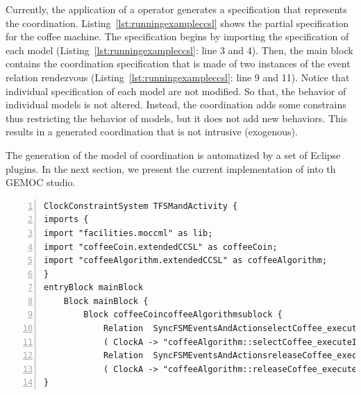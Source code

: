 Currently, the application of a \bcool operator generates a \ccsl specification that represents the coordination. Listing~\ref{lst:runningexampleccsl} shows the partial \ccsl specification for the coffee machine. The specification begins by importing the \ccsl specification of each model (Listing~\ref{lst:runningexampleccsl}: line 3 and 4). Then, the main block contains the coordination specification that is made of two instances of the event relation rendezvous (Listing~\ref{lst:runningexampleccsl}: line 9 and 11). Notice that individual specification of each model are not modified. So that, the behavior of individual models is not altered. Instead, the coordination adds some constrains thus restricting the behavior of models, but it does not add new behaviors. This results in a generated coordination that is not intrusive (\ie exogenous).

The generation of the model of coordination is automatized by a set of Eclipse plugins. In the next section, we present the current implementation of \bcool into th GEMOC studio. 




\begin{lstlisting}[language=moccml,
caption={Resulting \ccsl specification for the running example},
label={lst:runningexampleccsl}, 
basicstyle=\scriptsize\ttfamily, backgroundcolor=\color{LGrey}, numbers=left, xleftmargin=2pt]
ClockConstraintSystem TFSMandActivity {
imports {
import "facilities.moccml" as lib;
import "coffeeCoin.extendedCCSL" as coffeeCoin;
import "coffeeAlgorithm.extendedCCSL" as coffeeAlgorithm;
}
entryBlock mainBlock
	Block mainBlock {
		Block coffeeCoincoffeeAlgorithmsublock {
			Relation  SyncFSMEventsAndActionselectCoffee_executeItselectCoffee_occurs [ RendezVous ]
			( ClockA -> "coffeeAlgorithm::selectCoffee_executeIt", ClockB -> "coffeeCoin::selectCoffee_occurs")
			Relation  SyncFSMEventsAndActionsreleaseCoffee_executeItreleaseCoffee_occurs [ RendezVous ]
			( ClockA -> "coffeeAlgorithm::releaseCoffee_executeIt", ClockB -> "coffeeCoin::releaseCoffee_occurs")}}
}
\end{lstlisting}    